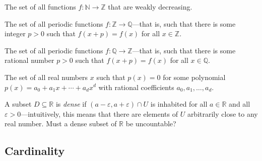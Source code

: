 \begin{chapex}
The set of all functions $f : \mathbb{N} \to \mathbb{Z}$ that are weakly decreasing.
\end{chapex}


\begin{chapex}
The set of all periodic functions $f : \mathbb{Z} \to \mathbb{Q}$---that is, such that there is some integer $p > 0$ such that $f(x+p) = f(x)$ for all $x \in \mathbb{Z}$.
\end{chapex}

\begin{chapex}
The set of all periodic functions $f : \mathbb{Q} \to \mathbb{Z}$---that is, such that there is some rational number $p > 0$ such that $f(x+p) = f(x)$ for all $x \in \mathbb{Q}$.
\end{chapex}

\begin{chapex}
\label{cqDetermineIfCountableEnd}
The set of all real numbers $x$ such that $p(x) = 0$ for some polynomial $p(x) = a_0 + a_1x + \cdots + a_dx^d$ with rational coefficients $a_0,a_1,\dots,a_d$.
\end{chapex}

\begin{chapex}
A subset $D \subseteq \mathbb{R}$ is \textit{dense} if $(a-\varepsilon, a+\varepsilon) \cap U$ is inhabited for all $a \in \mathbb{R}$ and all $\varepsilon > 0$---intuitively, this means that there are elements of $U$ arbitrarily close to any real number. Must a dense subset of $\mathbb{R}$ be uncountable?
\end{chapex}

\subsection*{Cardinality}


